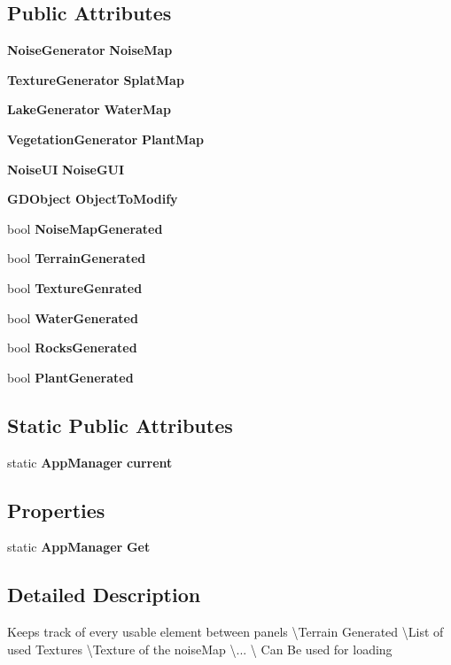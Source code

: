\subsection*{Public Attributes}
\begin{DoxyCompactItemize}
\item 
\textbf{ Noise\+Generator} \textbf{ Noise\+Map}
\item 
\textbf{ Texture\+Generator} \textbf{ Splat\+Map}
\item 
\textbf{ Lake\+Generator} \textbf{ Water\+Map}
\item 
\textbf{ Vegetation\+Generator} \textbf{ Plant\+Map}
\item 
\textbf{ Noise\+UI} \textbf{ Noise\+G\+UI}
\item 
\textbf{ G\+D\+Object} \textbf{ Object\+To\+Modify}
\item 
bool \textbf{ Noise\+Map\+Generated}
\item 
bool \textbf{ Terrain\+Generated}
\item 
bool \textbf{ Texture\+Genrated}
\item 
bool \textbf{ Water\+Generated}
\item 
bool \textbf{ Rocks\+Generated}
\item 
bool \textbf{ Plant\+Generated}
\end{DoxyCompactItemize}
\subsection*{Static Public Attributes}
\begin{DoxyCompactItemize}
\item 
static \textbf{ App\+Manager} \textbf{ current}
\end{DoxyCompactItemize}
\subsection*{Properties}
\begin{DoxyCompactItemize}
\item 
static \textbf{ App\+Manager} \textbf{ Get}\hspace{0.3cm}{\ttfamily  [get]}
\end{DoxyCompactItemize}


\subsection{Detailed Description}
Keeps track of every usable element between panels \textbackslash{}Terrain Generated \textbackslash{}List of used Textures \textbackslash{}Texture of the noise\+Map \textbackslash{}... \textbackslash{} Can Be used for loading 



